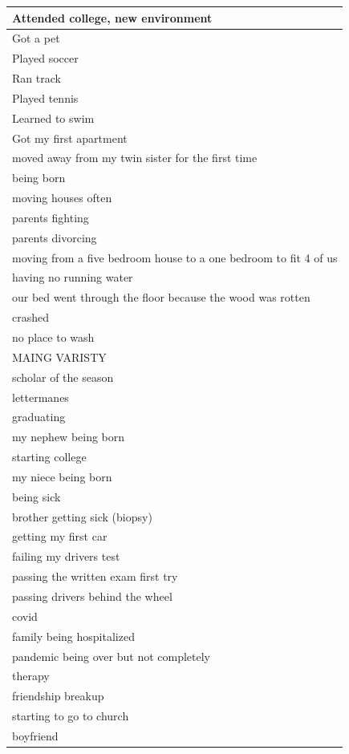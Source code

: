 \documentclass[
  .7em,
  letterpaper,
  DIV=11,
  numbers=noendperiod]{scrartcl}
\begin{document}
\begin{table}
\begin{tabular}{l}
\hline
Attended college, new environment\\
\hline
Got a pet\\
\hline
Played soccer\\
\hline
Ran track\\
\hline
Played tennis\\
\hline
Learned to swim\\
\hline
Got my first apartment\\
\hline
moved away from my twin sister for the first time\\
\hline
being born\\
\hline
moving houses often\\
\hline
parents fighting\\
\hline
parents divorcing\\
\hline
moving from a five bedroom house to a one bedroom to fit 4 of us\\
\hline
having no running water\\
\hline
our bed went through the floor because the wood was rotten\\
\hline
crashed\\
\hline
no place to wash\\
\hline
MAING VARISTY\\
\hline
scholar of the season\\
\hline
lettermanes\\
\hline
graduating\\
\hline
my nephew being born\\
\hline
starting college\\
\hline
my niece being born\\
\hline
being sick\\
\hline
brother getting sick (biopsy)\\
\hline
getting my first car\\
\hline
failing my drivers test\\
\hline
passing the written exam first try\\
\hline
passing drivers behind the wheel\\
\hline
covid\\
\hline
family being hospitalized\\
\hline
pandemic being over but not completely\\
\hline
therapy\\
\hline
friendship breakup\\
\hline
starting to go to church\\
\hline
boyfriend\\

\end{tabular}
\end{table}
\end{document}
